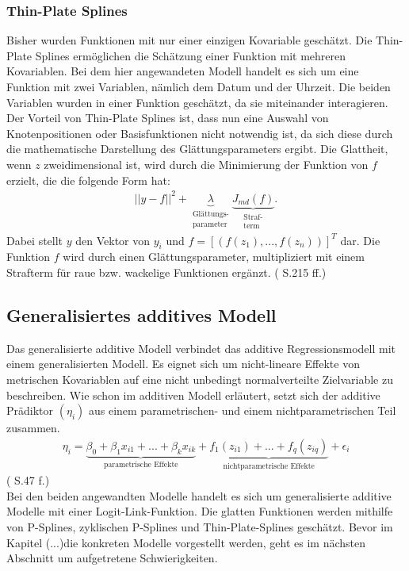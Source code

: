 \documentclass[12pt]{scrreprt}
\begin{document}
\subsubsection{Thin-Plate Splines}
Bisher wurden Funktionen mit nur einer einzigen Kovariable geschätzt. Die Thin-Plate Splines ermöglichen die Schätzung einer Funktion mit mehreren Kovariablen. Bei dem hier angewandeten Modell handelt es sich um eine Funktion mit zwei Variablen, nämlich dem Datum und der Uhrzeit. Die beiden Variablen wurden in einer Funktion geschätzt, da sie miteinander interagieren. Der Vorteil von Thin-Plate Splines ist, dass nun eine Auswahl von Knotenpositionen oder Basisfunktionen nicht notwendig ist, da sich diese durch die mathematische Darstellung des Glättungsparameters ergibt. Die Glattheit, wenn $z$ zweidimensional ist, wird durch die Minimierung der Funktion von $f$ erzielt, die die folgende Form hat:
\begin{align}
||y-f||^2+\underbrace{\lambda}_{\substack{\text{Glättungs-} \\ \text{parameter}}} \underbrace{J_{md}(f)}_{\substack{\text{Straf-} \\ \text{term}}}.
\end{align}
Dabei stellt $y$ den Vektor von $y_{i}$ und $f=[(f(z_{1}),...,f(z_{n}))]^T$ dar. Die Funktion $f$ wird durch einen Glättungsparameter, multipliziert mit einem Strafterm für raue bzw. wackelige Funktionen ergänzt. (\cite{wood2017generalized} S.215 ff.)

\subsection{Generalisiertes additives Modell}
Das generalisierte additive Modell verbindet das additive Regressionsmodell mit einem generalisierten Modell.
Es eignet sich um nicht-lineare Effekte von metrischen Kovariablen auf eine nicht unbedingt normalverteilte Zielvariable zu beschreiben. Wie schon im additiven Modell erläutert, setzt sich der additive Prädiktor $(\eta_{i})$ aus einem parametrischen- und einem nichtparametrischen Teil zusammen.
\begin{align}
\eta_{i}=\underbrace{\beta_{0}+\beta_{1}x_{i1}+...+\beta_{k}x_{ik}}_{\text{parametrische Effekte}}+ \underbrace{f_{1}(z_{i1})+...+f_{q}(z_{iq})}_{\text{nichtparametrische Effekte}}+\epsilon_{i}
\end{align}
(\cite{fahrmeir2007regression} S.47 f.) \\
Bei den beiden angewandten Modelle handelt es sich um generalisierte additive Modelle mit einer Logit-Link-Funktion. Die glatten Funktionen werden mithilfe von P-Splines, zyklischen P-Splines und Thin-Plate-Splines geschätzt. Bevor im Kapitel (...)die konkreten Modelle vorgestellt werden, geht es im nächsten Abschnitt um aufgetretene Schwierigkeiten.
\end{document}
